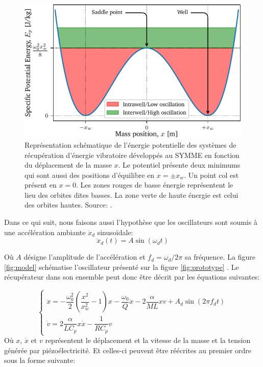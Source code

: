 \documentclass[a4paper, french, 12pt, titlepage]{article}
\begin{document}
\begin{figure}
  \begin{center}
    \includegraphics[width = .6\textwidth]{images/potential}
  \end{center}
  \caption{Représentation schématique de l'énergie potentielle des systèmes de récupération d'énergie vibratoire développés au SYMME en fonction du déplacement de la masse $x$.
    Le potentiel présente deux minimums qui sont aussi des positions d'équilibre en $x = \pm x_w$.
    Un point col est présent en $x = 0$.
    Les zones rouges de basse énergie représentent le lieu des orbites dites basses.
    La zone verte de haute énergie est celui des orbites hautes.  Source:  \cite{lcharleuxHDR}.}
  \label{fig:lc_potential}
\end{figure}

Dans ce qui suit, nous faisons aussi l'hypothèse que les oscillateurs sont soumis à une accélération ambiante $\ddot x_d$ sinusoïdale:
\begin{equation}
  \ddot x_d(t) = A \sin (\omega_d t)
\end{equation}

\noindent Où $A$ désigne l'amplitude de l'accélération et $f_d = \omega_d / 2 \pi$ sa fréquence.
La figure \ref{fig:model} schématise l'oscillateur présenté sur la figure \ref{fig:prototype} \cite{csaintmartin2023preprint}.
Le récupérateur dans son ensemble peut donc être décrit par les équations suivantes:

\begin{equation}
  \left\{
  \begin{array}{ll}
    \ddot{x} = -\dfrac{\omega_0^2}{2} \left( \dfrac{x^2}{x_w^2} - 1 \right) x - \dfrac{\omega_0}{Q} \dot{x} - 2 \dfrac{\alpha}{M L} x v + A_d \sin(2 \pi f_d t) \\[5mm]
    \dot{v} =   2 \dfrac{\alpha}{LC_p} x \dot{x} - \dfrac{1}{R C_p} v
  \end{array}
  \right.
  \label{eq:ode}
\end{equation}
Où $x$, $\dot{x}$ et $v$ représentent le déplacement et la vitesse de la masse et la tension générée par piézoélectricité.
\noindent Et celles-ci peuvent être réécrites au premier ordre sous la forme suivante:
\end{document}
